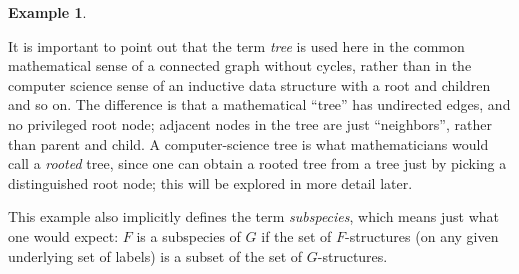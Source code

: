 \documentclass{amsart}
\theoremstyle{definition}
\newtheorem{ex}{Example}
\theoremstyle{remark}
\newcommand{\term}[1]{\emph{#1}}
\begin{document}
\begin{ex}
\begin{commentary}
  It is important to point out that the term \term{tree} is used here
  in the common mathematical sense of a connected graph without
  cycles, rather than in the computer science sense of an inductive
  data structure with a root and children and so on.  The difference
  is that a mathematical ``tree'' has undirected edges, and no
  privileged root node; adjacent nodes in the tree are just
  ``neighbors'', rather than parent and child.  A computer-science
  tree is what mathematicians would call a \term{rooted} tree, since
  one can obtain a rooted tree from a tree just by picking a
  distinguished root node; this will be explored in more detail
  later.

  This example also implicitly defines the term \term{subspecies},
  which means just what one would expect: $F$ is a subspecies of $G$
  if the set of $F$-structures (on any given underlying set of labels)
  is a subset of the set of $G$-structures.
\end{commentary}
\end{ex}
\end{document}
